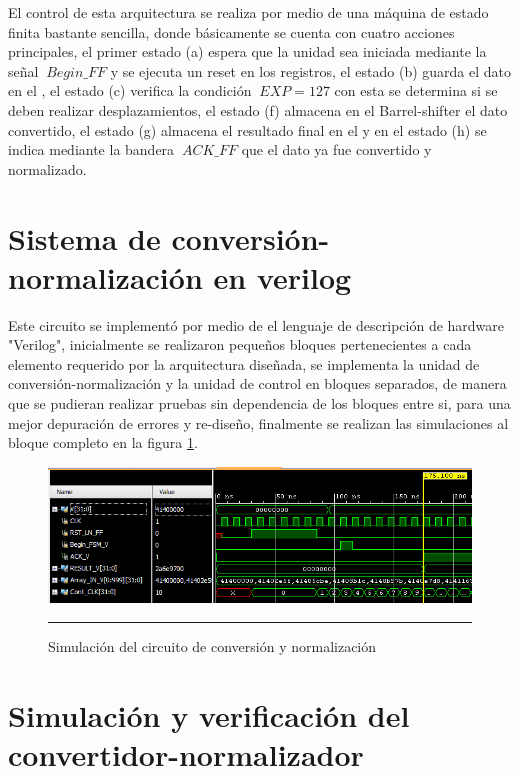 El control de esta arquitectura se realiza por medio de una máquina de estado finita bastante sencilla, donde básicamente se cuenta con cuatro acciones principales, el primer estado (a) espera que la unidad sea  iniciada mediante la señal $\ Begin\_FF$ y se ejecuta un reset en los registros, el estado (b) guarda el dato en el , el estado (c) verifica la condición $\ EXP=127 $ con esta se determina si se deben realizar desplazamientos, el estado (f) almacena en el Barrel-shifter el dato convertido, el estado (g) almacena el resultado final en el  y en el estado (h) se indica mediante la bandera $\ ACK\_FF$ que el dato ya fue convertido y normalizado.

\section{Sistema de conversión-normalización en verilog}

Este circuito se implementó por medio de el lenguaje de descripción de hardware "Verilog", inicialmente se realizaron pequeños bloques pertenecientes a cada elemento requerido por la arquitectura diseñada, se implementa la unidad de conversión-normalización y la unidad de control en bloques separados, de manera que se pudieran realizar pruebas sin dependencia de los bloques entre si, para una mejor depuración de errores y re-diseño, finalmente se realizan las simulaciones al bloque completo en la figura \ref{fig:SIMNORM}. 

\begin{figure}[H]
  \centering
    \includegraphics[scale=0.8]{./TEST_CONV_NOM_I.png}
    \rule{35em}{0.5pt}
  \caption[Simulación del circuito de conversión y normalización]{Simulación del circuito de conversión y normalización}
  \label{fig:SIMNORM}
\end{figure}

\section{Simulación y verificación del convertidor-normalizador}

